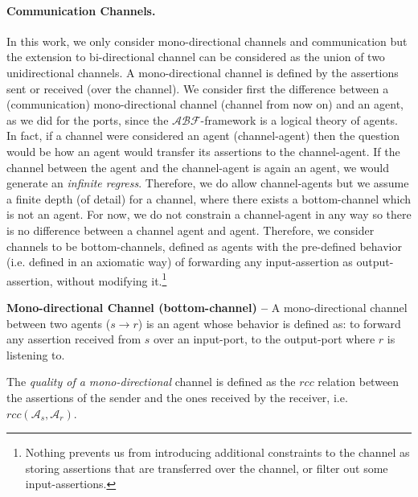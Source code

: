 \documentclass[runningheads]{llncs}
\newcommand{\assertionRegion}{\mathcal{A}}
\newcommand{\beliefRegion}{\mathcal{B}}
\newcommand{\factRegion}{\mathcal{F}}
\newcommand{\rcc}{rcc}
\newcommand{\abftheory}{\assertionRegion\beliefRegion\factRegion}
\newcommand{\Rcc}[2]{rcc(#1,#2)}
\begin{document}
\paragraph{Communication Channels.}
In this work, we only consider
mono-directional channels and communication but the extension to bi-directional
channel can be considered as the union of two unidirectional channels. A
mono-directional channel is defined by the assertions sent or received (over
the channel). 
We consider first the difference between a (communication)
mono-directional channel (channel from now on) and an agent, as we did for the
ports, since the $\abftheory$-framework is a logical theory of agents.  In fact, if a channel
were considered an agent (channel-agent) then the question would be how an
agent would transfer its assertions to the channel-agent. If the channel
between the agent and the channel-agent is again an agent, we would generate an
\emph{infinite regress}. Therefore, we do allow channel-agents but we assume a
finite depth (of detail) for a channel, where there exists a bottom-channel
which is not an agent. For now, we do not constrain a channel-agent in any way
so there is no difference between a channel agent and agent. Therefore,
we consider channels to be bottom-channels,
defined as agents with the pre-defined behavior (i.e. defined in an axiomatic
way) of forwarding any input-assertion as output-assertion, without modifying it.\footnote{Nothing
prevents us from introducing additional constraints to the channel as storing
assertions that are transferred over the channel, or filter out some
input-assertions.}

\begin{definition}{\bf Mono-directional Channel (bottom-channel) --}\label{def:monochannel}
	A mono-directional channel between two agents ($s \rightarrow r$) is
	an agent whose behavior is defined as: to
	forward any assertion received from $s$ over an input-port, to  the
	output-port where $r$ is listening to.
\end{definition}
The \emph{quality of a mono-directional} channel is defined as the $\rcc$
relation between the assertions of the sender and the ones received by the
receiver, i.e. $\Rcc{\assertionRegion_s}{\assertionRegion_r}$.
\end{document}
